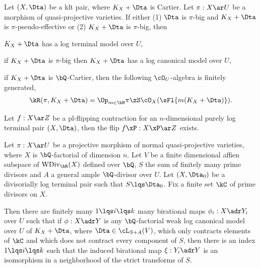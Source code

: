 \documentclass[a4paper, twoside]{article}
\begin{document}
\ifmain
    \title{}
    \author{Cong Wen, 09/24}
    \makeatletter
    \makeatother


    \tableofcontents
\fi





\begin{thm}
	Let $(X,\Dta)$ be a klt pair, where $K_{X}+\Dta$ is Cartier. Let $\pi:X\ar U$ be a morphism of quasi-projective varieties. If either (1) $\Dta$ is $\pi$-big and $K_{X}+\Dta$ is $\pi$-pseudo-effective or (2) $K_{X}+\Dta$ is $\pi$-big, then
	\begin{itm}
		\item $K_{X}+\Dta$ has a log terminal model over $U$,
		\item if $K_{X}+\Dta$ is $\pi$-big then $K_{X}+\Dta$ has a log canonical model over $U$,
		\item if $K_{X}+\Dta$ is $\bQ$-Cartier, then the following $\cO_{U}$-algebra is finitely generated,
		\[
			\kR(\pi,K_{X}+\Dta)=\Op_{m\in\bN}\pi\zS\cO_{X}(\sFl{m(K_{X}+\Dta)}).
		\]
	\end{itm}
\end{thm}


\begin{thm}[$A_{n}$]
	Let $f:X\ar Z$ be a pl-flipping contraction for an $n$-dimensional purely log terminal pair $(X,\Dta)$, then the flip $f\xP:X\xP\ar Z$ exists.
\end{thm}

\begin{thm}[$B_{n}$]
	Let $\pi:X\ar U$ be a projective morphism of normal quasi-projective varieties, where $X$ is $\bQ$-factorial of dimension $n$. Let $V$ be a finite dimensional affien subspace of $\mathrm{WDiv}_{\bR}(X)$ defined over $\bQ$, $S$ the sum of finitely many prime divisors and $A$ a general ample $\bQ$-divisor over $U$. Let $(X,\Dta_{0})$ be a divisorially log terminal pair such that $S\lqs\Dta_{0}$. Fix a finite set $\kC$ of prime divisors on $X$.

	Then there are finitely many $1\lqs i\lqs k$ many birational maps $\phi_{i}:X\adr Y_{i}$ over $U$ such that if $\phi:X\adr Y$ is any $\bQ$-factorial weak log canonical model over $U$ of $K_{X}+\Dta$, where $\Dta\in\cL_{S+A}(V)$, which only contracts elements of $\kC$ and which does not contract every component of $S$, then there is an index $1\lqs i\lqs k$ such that the induced birational map $\xi:Y_{i}\adr Y$ is an isomorphism in a neighborhood of the strict transforms of $S$.
\end{thm}




\ifmain
    
    
\fi
\end{document}
